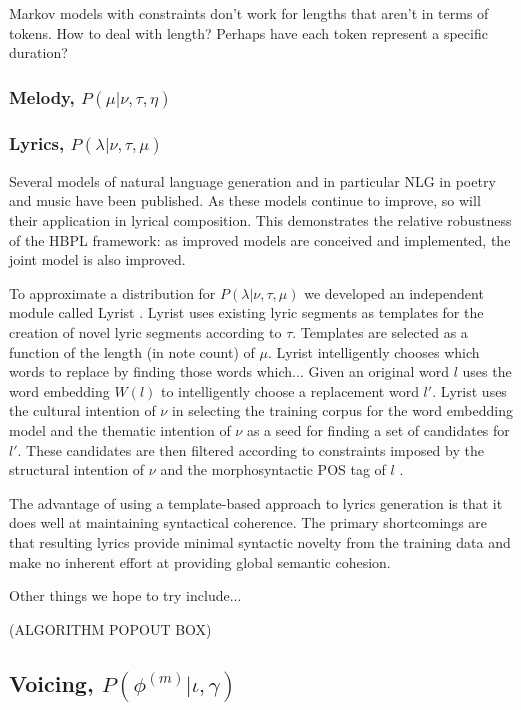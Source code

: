 \documentclass[letterpaper]{article}
\begin{document}
Markov models with constraints don't work for lengths that aren't in terms of tokens. How to deal with length? Perhaps have each token represent a specific duration?

\subsubsection{Melody, $P(\mu|\nu,\tau,\eta)$}



\subsubsection{Lyrics, $P(\lambda|\nu,\tau,\mu)$}

Several models of natural language generation and in particular NLG in poetry and music have been published. As these models continue to improve, so will their application in lyrical composition. This demonstrates the relative robustness of the HBPL framework: as improved models are conceived and implemented, the joint model is also improved.

To approximate a distribution for $P(\lambda|\nu,\tau,\mu)$ we developed an independent module called Lyrist \cite{bay:inpress-a}. Lyrist uses existing lyric segments as templates for the creation of novel lyric segments according to $\tau$. Templates are selected as a function of the length (in note count) of $\mu$. Lyrist intelligently chooses which words to replace by finding those words which... Given an original word $l$ uses the word embedding $W(l)$ to intelligently choose a replacement word $l'$. Lyrist uses the cultural intention of $\nu$ in selecting the training corpus for the word embedding model and the thematic intention of $\nu$ as a seed for finding a set of candidates for $l'$. These candidates are then filtered according to constraints imposed by the structural intention of $\nu$ and the morphosyntactic POS tag of $l$ \cite{bay:inpress-a}.

The advantage of using a template-based approach to lyrics generation is that it does well at maintaining syntactical coherence. The primary shortcomings are that resulting lyrics provide minimal syntactic novelty from the training data and make no inherent effort at providing global semantic cohesion.

Other things we hope to try include...

  (ALGORITHM POPOUT BOX)

\subsection{Voicing, $P(\phi^{(m)}|\iota,\gamma)$}
\end{document}
